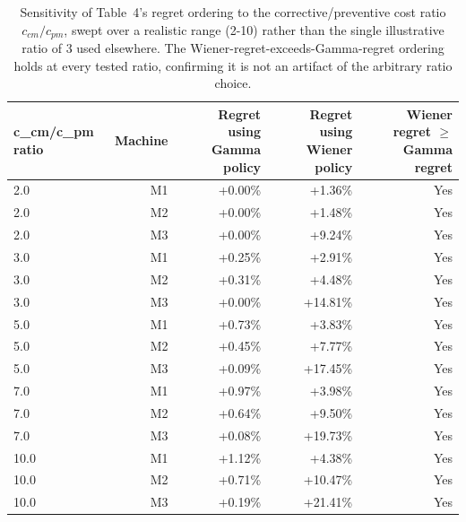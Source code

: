 \begin{table}[t]
\centering
\caption{Sensitivity of Table~4's regret ordering to the corrective/preventive cost ratio $c_{cm}/c_{pm}$, swept over a realistic range (2-10) rather than the single illustrative ratio of 3 used elsewhere. The Wiener-regret-exceeds-Gamma-regret ordering holds at every tested ratio, confirming it is not an artifact of the arbitrary ratio choice.}
\label{tab:cost-ratio-sensitivity}
\begin{tabular}{lrrrr}
\toprule
c\_cm/c\_pm ratio & Machine & Regret using Gamma policy & Regret using Wiener policy & Wiener regret $\geq$ Gamma regret \\
\midrule
2.0 & M1 & +0.00\% & +1.36\% & Yes \\
2.0 & M2 & +0.00\% & +1.48\% & Yes \\
2.0 & M3 & +0.00\% & +9.24\% & Yes \\
3.0 & M1 & +0.25\% & +2.91\% & Yes \\
3.0 & M2 & +0.31\% & +4.48\% & Yes \\
3.0 & M3 & +0.00\% & +14.81\% & Yes \\
5.0 & M1 & +0.73\% & +3.83\% & Yes \\
5.0 & M2 & +0.45\% & +7.77\% & Yes \\
5.0 & M3 & +0.09\% & +17.45\% & Yes \\
7.0 & M1 & +0.97\% & +3.98\% & Yes \\
7.0 & M2 & +0.64\% & +9.50\% & Yes \\
7.0 & M3 & +0.08\% & +19.73\% & Yes \\
10.0 & M1 & +1.12\% & +4.38\% & Yes \\
10.0 & M2 & +0.71\% & +10.47\% & Yes \\
10.0 & M3 & +0.19\% & +21.41\% & Yes \\
\bottomrule
\end{tabular}
\end{table}
